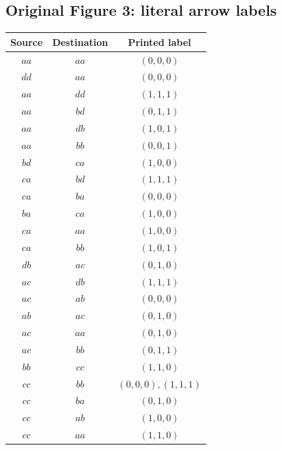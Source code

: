 \documentclass[11pt]{article}
\theoremstyle{remark}\newtheorem{remark}[theorem]{Remark}
\begin{document}
\subsection*{Original Figure 3: literal arrow labels}
\begin{center}\begin{tabular}{ccc}\toprule Source&Destination&Printed label\\\midrule
$aa$&$aa$&$(0,0,0)$\\
$dd$&$aa$&$(0,0,0)$\\
$aa$&$dd$&$(1,1,1)$\\
$aa$&$bd$&$(0,1,1)$\\
$aa$&$db$&$(1,0,1)$\\
$aa$&$bb$&$(0,0,1)$\\
$bd$&$ca$&$(1,0,0)$\\
$ca$&$bd$&$(1,1,1)$\\
$ca$&$ba$&$(0,0,0)$\\
$ba$&$ca$&$(1,0,0)$\\
$ca$&$aa$&$(1,0,0)$\\
$ca$&$bb$&$(1,0,1)$\\
$db$&$ac$&$(0,1,0)$\\
$ac$&$db$&$(1,1,1)$\\
$ac$&$ab$&$(0,0,0)$\\
$ab$&$ac$&$(0,1,0)$\\
$ac$&$aa$&$(0,1,0)$\\
$ac$&$bb$&$(0,1,1)$\\
$bb$&$cc$&$(1,1,0)$\\
$cc$&$bb$&$(0,0,0), (1,1,1)$\\
$cc$&$ba$&$(0,1,0)$\\
$cc$&$ab$&$(1,0,0)$\\
$cc$&$aa$&$(1,1,0)$\\
\bottomrule\end{tabular}\end{center}
\end{document}
